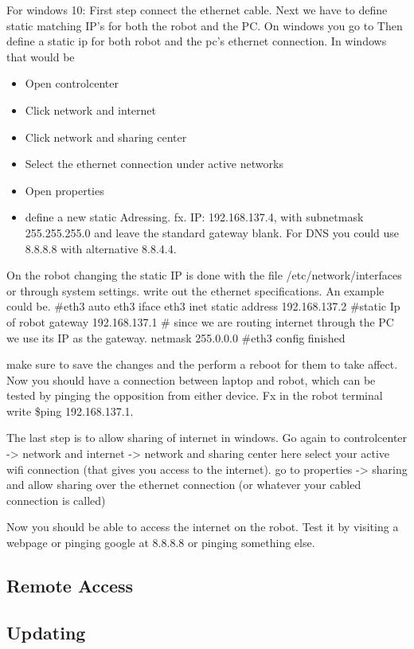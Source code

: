 \documentclass{article}
\begin{document}
For windows 10: 
First step connect the ethernet cable.
Next we have to define static matching IP's for both the robot and the PC. 
On windows you go to 
Then define a static ip for both robot and the pc's ethernet connection. 
In windows that would be
\begin{itemize}
\item Open controlcenter
\item Click network and internet
\item Click network and sharing center
\item Select the ethernet connection under active networks 
\item Open properties
\item define a new static Adressing. fx. IP: 192.168.137.4, with subnetmask 255.255.255.0 and leave the standard gateway blank. For DNS you could use 8.8.8.8 with alternative 8.8.4.4.
\end{itemize}

On the robot changing the static IP is done with the file /etc/network/interfaces or through system settings. 
write out the ethernet specifications. An example could be. 
\#eth3
auto eth3 
iface eth3 inet static 
address 192.168.137.2 \#static Ip of robot
gateway 192.168.137.1 \# since we are routing internet through the PC we use its IP as the gateway. 
netmask 255.0.0.0  
\#eth3 config finished

make sure to save the changes and the perform a reboot for them to take affect. 
Now you should have a connection between laptop and robot, which can be tested by pinging the opposition from either device. Fx in the robot terminal write \$ping 192.168.137.1.
 
The last step is to allow sharing of internet in windows. Go again to controlcenter -> network and internet -> network and sharing center here select your active wifi connection (that gives you access to the internet). go to properties -> sharing and allow sharing over the ethernet connection (or whatever your cabled connection is called)

Now you should be able to access the internet on the robot. Test it by visiting a webpage or pinging google at 8.8.8.8 or pinging something else. 

\subsection{Remote Access}
\subsection{Updating}
\end{document}
